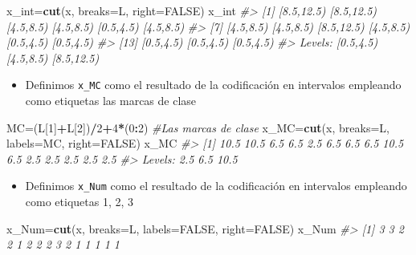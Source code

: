 \documentclass[
]{book}
\newenvironment{Shaded}{\begin{snugshade}}{\end{snugshade}}
\newcommand{\CommentTok}[1]{\textcolor[rgb]{0.56,0.35,0.01}{\textit{#1}}}
\newcommand{\DataTypeTok}[1]{\textcolor[rgb]{0.13,0.29,0.53}{#1}}
\newcommand{\DecValTok}[1]{\textcolor[rgb]{0.00,0.00,0.81}{#1}}
\newcommand{\KeywordTok}[1]{\textcolor[rgb]{0.13,0.29,0.53}{\textbf{#1}}}
\newcommand{\NormalTok}[1]{#1}
\newcommand{\OperatorTok}[1]{\textcolor[rgb]{0.81,0.36,0.00}{\textbf{#1}}}
\newcommand{\OtherTok}[1]{\textcolor[rgb]{0.56,0.35,0.01}{#1}}
\providecommand{\tightlist}{%
  \setlength{\itemsep}{0pt}\setlength{\parskip}{0pt}}
\theoremstyle{definition}
\theoremstyle{definition}
\theoremstyle{definition}
\theoremstyle{remark}
\begin{document}
\begin{Shaded}
\begin{Highlighting}[]
\NormalTok{x\_int=}\KeywordTok{cut}\NormalTok{(x, }\DataTypeTok{breaks=}\NormalTok{L, }\DataTypeTok{right=}\OtherTok{FALSE}\NormalTok{)}
\NormalTok{x\_int}
\CommentTok{\#\textgreater{}  [1] [8.5,12.5) [8.5,12.5) [4.5,8.5)  [4.5,8.5)  [0.5,4.5)  [4.5,8.5) }
\CommentTok{\#\textgreater{}  [7] [4.5,8.5)  [4.5,8.5)  [8.5,12.5) [4.5,8.5)  [0.5,4.5)  [0.5,4.5) }
\CommentTok{\#\textgreater{} [13] [0.5,4.5)  [0.5,4.5)  [0.5,4.5) }
\CommentTok{\#\textgreater{} Levels: [0.5,4.5) [4.5,8.5) [8.5,12.5)}
\end{Highlighting}
\end{Shaded}

\begin{itemize}
\tightlist
\item
  Definimos \texttt{x\_MC} como el resultado de la codificación en intervalos empleando como etiquetas las marcas de clase
\end{itemize}

\begin{Shaded}
\begin{Highlighting}[]
\NormalTok{MC=(L[}\DecValTok{1}\NormalTok{]}\OperatorTok{+}\NormalTok{L[}\DecValTok{2}\NormalTok{])}\OperatorTok{/}\DecValTok{2}\OperatorTok{+}\DecValTok{4}\OperatorTok{*}\NormalTok{(}\DecValTok{0}\OperatorTok{:}\DecValTok{2}\NormalTok{)  }\CommentTok{\#Las marcas de clase}
\NormalTok{x\_MC=}\KeywordTok{cut}\NormalTok{(x, }\DataTypeTok{breaks=}\NormalTok{L, }\DataTypeTok{labels=}\NormalTok{MC, }\DataTypeTok{right=}\OtherTok{FALSE}\NormalTok{)}
\NormalTok{x\_MC}
\CommentTok{\#\textgreater{}  [1] 10.5 10.5 6.5  6.5  2.5  6.5  6.5  6.5  10.5 6.5  2.5  2.5  2.5  2.5  2.5 }
\CommentTok{\#\textgreater{} Levels: 2.5 6.5 10.5}
\end{Highlighting}
\end{Shaded}

\begin{itemize}
\tightlist
\item
  Definimos \texttt{x\_Num} como el resultado de la codificación en intervalos empleando como etiquetas 1, 2, 3
\end{itemize}

\begin{Shaded}
\begin{Highlighting}[]
\NormalTok{x\_Num=}\KeywordTok{cut}\NormalTok{(x, }\DataTypeTok{breaks=}\NormalTok{L, }\DataTypeTok{labels=}\OtherTok{FALSE}\NormalTok{, }\DataTypeTok{right=}\OtherTok{FALSE}\NormalTok{)}
\NormalTok{x\_Num}
\CommentTok{\#\textgreater{}  [1] 3 3 2 2 1 2 2 2 3 2 1 1 1 1 1}
\end{Highlighting}
\end{Shaded}
\end{document}
